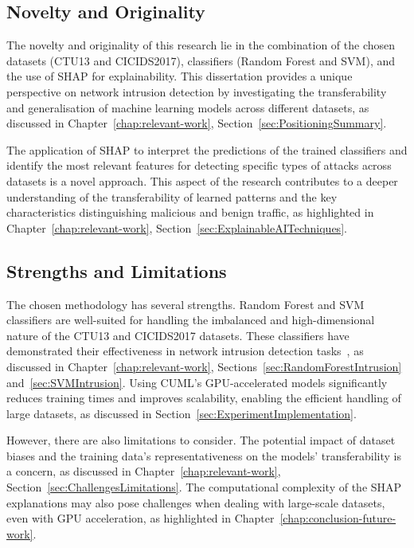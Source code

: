 \subsection{Novelty and Originality}\label{subsec:novelty-originality}
The novelty and originality of this research lie in the combination of the chosen datasets (CTU13 and CICIDS2017), classifiers (Random Forest and SVM), and the use of SHAP for explainability. This dissertation provides a unique perspective on network intrusion detection by investigating the transferability and generalisation of machine learning models across different datasets, as discussed in Chapter~\ref{chap:relevant-work}, Section~\ref{sec:PositioningSummary}.

The application of SHAP to interpret the predictions of the trained classifiers and identify the most relevant features for detecting specific types of attacks across datasets is a novel approach. This aspect of the research contributes to a deeper understanding of the transferability of learned patterns and the key characteristics distinguishing malicious and benign traffic, as highlighted in Chapter~\ref{chap:relevant-work}, Section~\ref{sec:ExplainableAITechniques}.

\subsection{Strengths and Limitations}\label{subsec:strengths-limitations}
The chosen methodology has several strengths. Random Forest and SVM classifiers are well-suited for handling the imbalanced and high-dimensional nature of the CTU13 and CICIDS2017 datasets. These classifiers have demonstrated their effectiveness in network intrusion detection tasks~\cite{farnaaz2016random, teng2017svm}, as discussed in Chapter~\ref{chap:relevant-work}, Sections~\ref{sec:RandomForestIntrusion} and~\ref{sec:SVMIntrusion}. Using CUML's GPU-accelerated models significantly reduces training times and improves scalability, enabling the efficient handling of large datasets, as discussed in Section~\ref{sec:ExperimentImplementation}.

However, there are also limitations to consider. The potential impact of dataset biases and the training data's representativeness on the models' transferability is a concern, as discussed in Chapter~\ref{chap:relevant-work}, Section~\ref{sec:ChallengesLimitations}. The computational complexity of the SHAP explanations may also pose challenges when dealing with large-scale datasets, even with GPU acceleration, as highlighted in Chapter~\ref{chap:conclusion-future-work}.

